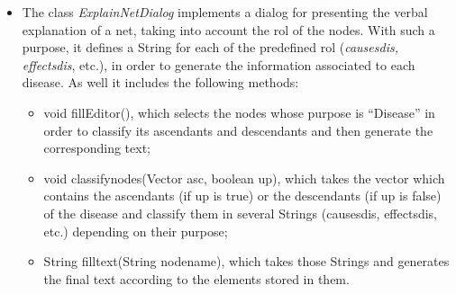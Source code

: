 \begin{itemize}
\item The class \emph{ExplainNetDialog} implements a dialog for
presenting the verbal explanation of a net, taking into account
the rol of the nodes. With such a purpose, it defines a String for
each of the predefined rol (\emph{causesdis, effectsdis}, etc.),
in order to generate the information associated to each disease.
As well it includes the following methods:
\begin{itemize}
  \item void fillEditor(), which selects the nodes whose purpose
  is ``Disease'' in order to classify its ascendants and descendants and then generate the corresponding text;
  \item void classifynodes(Vector asc, boolean up), which takes
  the vector which contains the ascendants (if up is true) or the
  descendants (if up is false) of the disease and classify them in
  several Strings (causesdis, effectsdis, etc.) depending on their purpose;
  \item String filltext(String nodename), which takes those Strings and generates the final
  text according to the elements stored in them.
\end{itemize}

\end{itemize}


